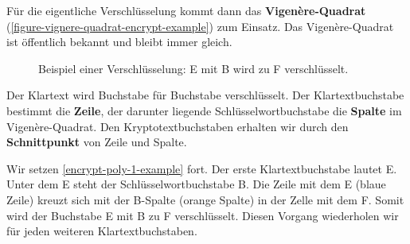 Für die eigentliche Verschlüsselung kommt dann das \textbf{Vigenère-Quadrat}  (\autoref{figure-vignere-quadrat-encrypt-example}) zum Einsatz. Das Vigenère-Quadrat ist öffentlich bekannt und bleibt immer gleich.

\begin{figure}[htb]
\centering
{}
\caption{Beispiel einer Verschlüsselung: E mit B wird zu F verschlüsselt.}
\label{figure-vignere-quadrat-encrypt-example}
\end{figure}

Der Klartext wird Buchstabe für Buchstabe verschlüsselt. Der Klartextbuchstabe bestimmt die \textbf{Zeile}, der darunter liegende Schlüsselwortbuchstabe die \textbf{Spalte} im Vigenère-Quadrat. Den Kryptotextbuchstaben erhalten wir durch den \textbf{Schnittpunkt} von Zeile und Spalte.

\begin{example}
\label{encrypt-poly-2-example}
Wir setzen \autoref{encrypt-poly-1-example} fort. Der erste Klartextbuchstabe lautet E. Unter dem E steht der Schlüsselwortbuchstabe B. Die Zeile mit dem E (blaue Zeile) kreuzt sich mit der B-Spalte (orange Spalte) in der Zelle mit dem F. Somit wird der Buchstabe E mit B zu F verschlüsselt. Diesen Vorgang wiederholen wir für jeden weiteren Klartextbuchstaben.
\end{example}

